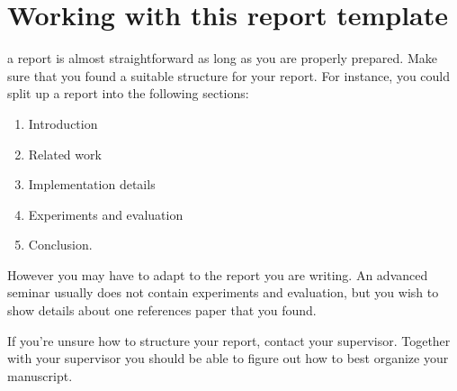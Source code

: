 \documentclass[10pt,a4paper,twoside,journal]{IEEEtran}
\begin{document}
\title{\submissiontitle}
\maketitle

\begin{abstract}
	To implement an autonomous driver in The Open Racing Car Simulator (TORCS)
	based on a deep neural network (DNN) and spiking neural network (SNN) multiple
	sensor cues are used. Specifically, the DNN predicts the current car displacement
	and angle to the road centre from a driver's view image. Based on the two values
	a SNN generates driving commands for the car. Subsequently, the car is put onto a 
	new track and the driving performance is evaluated.\
	The DNN is based on a Convolutional Neural Network and after training the mean 
	absolute error for the displacement is XXXX and for the angle is XXX on an
	unseen test track.
\end{abstract}

%
%
\section{Working with this report template}

 a report is almost straightforward as long as you are
properly prepared. Make sure that you found a suitable structure for your
report. For instance, you could split up a report into the following sections:

\begin{enumerate}
	\item Introduction
	\item Related work
	\item Implementation details
	\item Experiments and evaluation
	\item Conclusion.
\end{enumerate}

However you may have to adapt to the report you are writing. An advanced seminar
usually does not contain experiments and evaluation, but you wish to show
details about one references paper that you found.

If you're unsure how to structure your report, contact your supervisor. Together
with your supervisor you should be able to figure out how to best organize your
manuscript.
\end{document}
